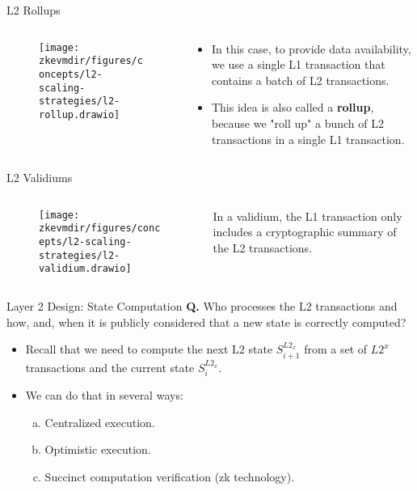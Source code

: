 \begin{frame}{L2 Rollups}
\begin{columns}
\begin{column}{0.65\textwidth}
\begin{figure}
\texttt{[image: \\zkevmdir/figures/concepts/l2-scaling-strategies/l2-rollup.drawio]}
\end{figure}
\end{column}

\begin{column}{0.35\textwidth}
\begin{itemize}
\item In this case, to provide data availability, we use a single L1 transaction that contains a batch of L2 transactions.
\item This idea is also called a \textbf{rollup}, because we "roll up" a bunch of L2 transactions in a single L1 transaction.
\end{itemize}
\end{column}
\end{columns}
\end{frame}

\begin{frame}{L2 Validiums}
\begin{columns}
\begin{column}{0.65\textwidth}
\begin{figure}
\texttt{[image: \\zkevmdir/figures/concepts/l2-scaling-strategies/l2-validium.drawio]}
\end{figure}
\end{column}
\begin{column}{0.35\textwidth}
  In a validium, the L1 transaction only includes a cryptographic summary of the L2 transactions.
\end{column}
\end{columns}
\end{frame}


\begin{frame}{Layer 2 Design: State Computation}
\textbf{Q.} Who processes the L2 transactions and how, and, when it is publicly considered that a new state is correctly computed?
\begin{itemize}
\item Recall that we need to compute the next L2 state $S^{L2_x}_{i+1}$ from a set of $L2^x$ transactions and the current state $S^{L2_x}_i$.
\item We can do that in several ways:
  \begin{enumerate}[a)]
  \item Centralized execution.
  \item Optimistic execution.
  \item Succinct computation verification (zk technology).
  \end{enumerate}
\end{itemize}
\end{frame}






